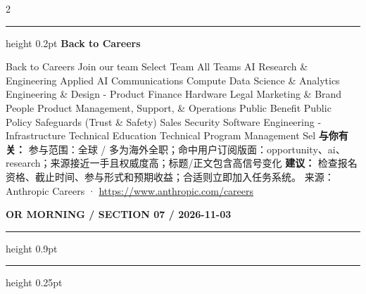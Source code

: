 \documentclass[10.5pt]{ctexart}
\begin{document}
\begin{multicols}{2}
\hrule height 0.2pt
\vspace{2mm}
{\large\bfseries Back to Careers}\par
Back to Careers Join our team Select Team All Teams AI Research \& Engineering Applied AI Communications Compute Data Science \& Analytics Engineering \& Design - Product Finance Hardware Legal Marketing \& Brand People Product Management, Support, \& Operations Public Benefit Public Policy Safeguards (Trust \& Safety) Sales Security Software Engineering - Infrastructure Technical Education Technical Program Management Sel
\textbf{与你有关：} 参与范围：全球 / 多为海外全职；命中用户订阅版面：opportunity、ai、research；来源接近一手且权威度高；标题/正文包含高信号变化
\textbf{建议：} 检查报名资格、截止时间、参与形式和预期收益；合适则立即加入任务系统。
{\footnotesize\color{ormuted} 来源：Anthropic Careers · \url{https://www.anthropic.com/careers}}
\end{multicols}
\newpage
{\small\bfseries OR MORNING / SECTION 07 / 2026-11-03}
\vspace{2mm}
\hrule height 0.9pt
\vspace{1.5mm}
\hrule height 0.25pt
\vspace{4mm}
\end{document}
